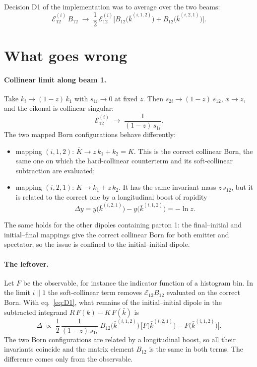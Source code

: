 \documentclass[11pt,a4paper]{article}
\newcommand{\kb}{\bar k}
\newcommand{\E}{\mathcal E}
\begin{document}
Decision D1 of the implementation was to average over the two beams:
\begin{equation}
  \E^{(i)}_{12}\,B_{12} \;\longrightarrow\;
  \frac12\,\E^{(i)}_{12}\Big[B_{12}\big(\kb^{(i,1,2)}\big)
                            + B_{12}\big(\kb^{(i,2,1)}\big)\Big].
  \label{eq:D1}
\end{equation}

\section{What goes wrong}

\paragraph{Collinear limit along beam 1.}
Take $k_i \to (1-z)\,k_1$ with $s_{1i}\to 0$ at fixed $z$. Then
$s_{2i}\to(1-z)\,s_{12}$, $x\to z$, and the eikonal is collinear singular:
\begin{equation}
  \E^{(i)}_{12} \;\to\; \frac{1}{(1-z)\,s_{1i}} .
\end{equation}
The two mapped Born configurations behave differently:
\begin{itemize}
\item mapping $(i,1,2)$: $\bar K \to z\,k_1 + k_2 = K$. This is the correct
      collinear Born, the same one on which the hard-collinear counterterm and
      its soft-collinear subtraction are evaluated;
\item mapping $(i,2,1)$: $\bar K \to k_1 + z\,k_2$. It has the same invariant
      mass $z\,s_{12}$, but it is related to the correct one by a longitudinal
      boost of rapidity
      \begin{equation}
        \Delta y = y\big(\kb^{(i,2,1)}\big) - y\big(\kb^{(i,1,2)}\big) = -\ln z .
      \end{equation}
\end{itemize}
The same holds for the other dipoles containing parton 1: the final--initial
and initial--final mappings give the correct collinear Born for both emitter
and spectator, so the issue is confined to the initial--initial dipole.

\paragraph{The leftover.}
Let $F$ be the observable, for instance the indicator function of a histogram
bin. In the limit $i\parallel 1$ the soft-collinear term removes
$\E_{12}B_{12}$ evaluated on the correct Born. With
eq.~\eqref{eq:D1}, what remains of the initial--initial dipole in the
subtracted integrand $R\,F(k) - K\,F(\kb)$ is
\begin{equation}
  \Delta \;\propto\; \frac{1}{2}\,\frac{1}{(1-z)\,s_{1i}}\;
  B_{12}\big(\kb^{(i,1,2)}\big)\,
  \Big[F\big(\kb^{(i,2,1)}\big) - F\big(\kb^{(i,1,2)}\big)\Big].
  \label{eq:leftover}
\end{equation}
The two Born configurations are related by a longitudinal boost, so all their
invariants coincide and the matrix element $B_{12}$ is the same in both
terms. The difference comes only from the observable.
\end{document}
